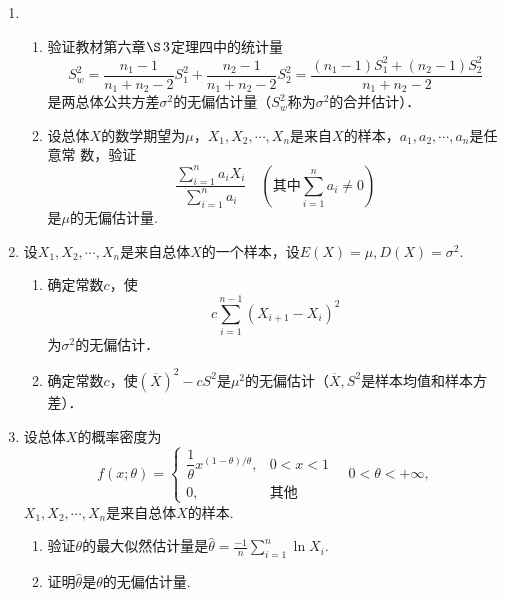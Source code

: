 \documentclass[10pt,a4paper]{article}
\begin{document}
\begin{enumerate}
    \item \begin{enumerate}
        \item 验证教材第六章$\S\, 3$定理四中的统计量
        $$S_w^2=\frac{n_1-1}{n_1+n_2-2}S_1^2+\frac{n_2-1}{n_1+n_2-2}S_2^2=\frac{(n_1-1)S_1^2+(n_2-1)S_2^2}{n_1+n_2-2}$$
        是两总体公共方差$\sigma^2$的无偏估计量（$S_w^2$称为$\sigma^2$的合并估计）．
        \item 设总体$X$的数学期望为$\mu$，$X_1,X_2,\cdots,X_n$是来自$X$的样本，$a_1,a_2,\cdots,a_n$是任意常
        数，验证
        $$\frac{\displaystyle{\sum_{i=1}^n a_i X_i}}{\displaystyle{\sum _{i=1}^n a_i}}\quad(\mbox{其中}\sum_{i=1}^n a_i \neq 0)$$
        是$\mu$的无偏估计量.
    \end{enumerate}



    \item 设$X_1,X_2,\cdots,X_n$是来自总体$X$的一个样本，设$E(X)=\mu,D(X)=\sigma^2$.
    \begin{enumerate}
        \item 确定常数$c$，使$$c\sum_{i=1}^{n-1}(X_{i+1}-X_i)^2$$为$\sigma^2$的无偏估计．
        \item 确定常数$c$，使$(\overline{X})^2-cS^2$是$\mu^2$的无偏估计（$\overline{X},S^2$是样本均值和样本方差）．
    \end{enumerate}



    \item 设总体$X$的概率密度为
    \renewcommand{\arraystretch}{1.3}
    $$f(x;\theta)=\left\{\begin{array}{ll}
        \dfrac{1}{\theta}x^{(1-\theta)/\theta}, & 0<x<1\\
        0, & \mbox{其他}
    \end{array}\right.\quad 0<\theta<+\infty,$$
    \renewcommand{\arraystretch}{1.0}
    $X_1,X_2,\cdots,X_n$是来自总体$X$的样本.
    \begin{enumerate}
        \item 验证$\theta$的最大似然估计量是$\displaystyle{\hat{\theta}=\frac{-1}{n}\sum_{i=1}^n \ln X_i}$.
        \item 证明$\hat{\theta}$是$\theta$的无偏估计量.
    \end{enumerate}



\end{enumerate}
\end{document}
